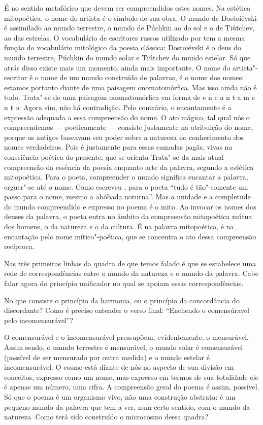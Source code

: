 É no sentido metafórico que devem ser compreendidos estes nomes. Na
estética mitopoética, o nome do artista é o símbolo de sua obra. O mundo
de Dostoiévski é assimilado ao mundo terrestre, o mundo de Púchkin ao do
sol e o de Tiútchev, ao das estrelas. O vocabulário de escritores russos
utilizado por  tem a mesma função do vocabulário mitológico da poesia
clássica: Dostoiévski é o deus do mundo terrestre, Púchkin do mundo
solar e Tiútchev do mundo estelar. Só que atrás disso existe mais um
momento, ainda mais importante. O nome do artista"-escritor é o nome de
um mundo construído de palavras, é o nome dos nomes: estamos portanto
diante de uma paisagem onomatomórfica. Mas isso ainda não é tudo.
Trata"-se de uma paisagem onomatomórfica em forma de e n c a n t a m e n
t o. Agora sim, não há contradição. Pelo contrário, o encantamento é a
expressão adequada a essa compreensão do nome. O ato mágico, tal qual
nós o compreendemos --- poeticamente --- consiste justamente na
atribuição do nome, porque os antigos baseavam seu poder sobre a
natureza no conhecimento dos nomes verdadeiros. Pois é justamente para
essas camadas pagãs, vivas na consciência poética do presente, que se
orienta  Trata"-se da mais atual compreensão da essência da poesia
enquanto arte da palavra, segundo a estética mitopoética. Para o poeta,
compreender o mundo significa encantar a palavra, erguer"-se até o nome.
Como escreveu , para o poeta ``tudo é tão"-somente um passo para o
nome, mesmo a abóbada noturna''. Mas a unidade e a completude do mundo
compreendido e expresso no poema é o mito. Ao invocar os nomes dos
deuses da palavra, o poeta entra no âmbito da compreensão mitopoética
mútua dos homens, o da natureza e o da cultura. É na palavra
mitopoética, é na encantação pelo nome mítico"-poética, que se concentra
o ato dessa compreensão recíproca.

Nas três primeiras linhas da quadra de que temos falado é que se
estabelece uma rede de correspondências entre o mundo da natureza e o
mundo da palavra. Cabe falar agora do princípio unificador no qual se
apoiam essas correspondências.

No que consiste o princípio da harmonia, ou o princípio da concordância
do discordante? Como é preciso entender o verso final: ``Enchendo o
comensúravel pelo incomensurável''?

O comensurável e o incomensurável pressupõem, evidentemente, o
mensurável. Assim sendo, o mundo terrestre é mensurável, o mundo solar é
comensurável (passível de ser mensurado por outra medida) e o mundo
estelar é incomensurável. O cosmo está diante de nós no aspecto de sua
divisão em conceitos, expresso como um nome, mas expresso em termos de
sua totalidade ele é apenas um número, uma cifra. A compreensão geral do
poema é assim, possível. Só que o poema é um organismo vivo, não uma
construção abstrata: é um pequeno mundo da palavra que tem a ver, num
certo sentido, com o mundo da natureza. Como terá sido construído o
microcosmo dessa quadra?

